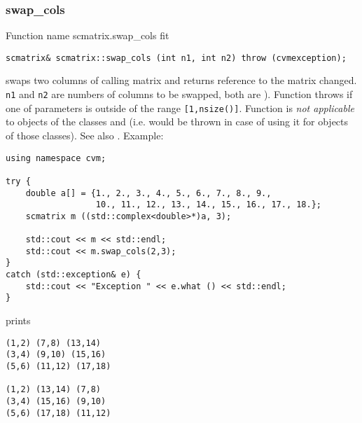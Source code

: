 \subsubsection{swap\_cols}
Function%
\pdfdest name {scmatrix.swap_cols} fit
\begin{verbatim}
scmatrix& scmatrix::swap_cols (int n1, int n2) throw (cvmexception);
\end{verbatim}
swaps two columns of  calling matrix and returns  reference to
the matrix changed. \verb"n1" and \verb"n2" are
 numbers of columns to be swapped, 
both are \Based).
Function throws  
if one of  parameters is outside of the range
\verb"[1,nsize()]".
Function is 
\emph{not applicable} to objects of the classes
 and
 (i.e.  would be thrown
in case of using it for objects of those classes).
See also .
Example:
\begin{Verbatim}
using namespace cvm;

try {
    double a[] = {1., 2., 3., 4., 5., 6., 7., 8., 9.,
                  10., 11., 12., 13., 14., 15., 16., 17., 18.};
    scmatrix m ((std::complex<double>*)a, 3);

    std::cout << m << std::endl;
    std::cout << m.swap_cols(2,3);
}
catch (std::exception& e) {
    std::cout << "Exception " << e.what () << std::endl;
}
\end{Verbatim}
prints
\begin{Verbatim}
(1,2) (7,8) (13,14)
(3,4) (9,10) (15,16)
(5,6) (11,12) (17,18)

(1,2) (13,14) (7,8)
(3,4) (15,16) (9,10)
(5,6) (17,18) (11,12)
\end{Verbatim}
\newpage




